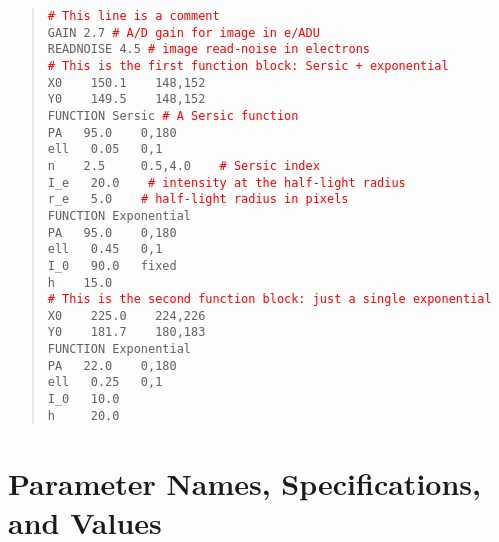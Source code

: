 \documentclass[10pt,a4paper,article]{memoir}
\newcommand{\red}{\textcolor{red}}
\begin{document}
\begin{quote}
  \texttt{\red{\# This line is a comment}}\\
  
  \texttt{GAIN  2.7   \red{\# A/D gain for image in e/ADU}}\\
  \texttt{READNOISE  4.5   \red{\# image read-noise in electrons}}\\
  
  \texttt{\red{\# This is the first function block: Sersic + exponential}}\\
  \texttt{X0 ~~   150.1  ~~ 148,152}\\
  \texttt{Y0 ~~   149.5  ~~ 148,152}\\
  \texttt{FUNCTION   Sersic   \red{\# A Sersic function}}\\
  \texttt{PA  ~  95.0  ~~ 0,180}\\
  \texttt{ell ~   0.05 ~ 0,1}\\
  \texttt{n   ~~   2.5  ~~~ 0.5,4.0 ~~ \red{\# Sersic index}}\\
  \texttt{I\_e ~  20.0 ~~ \red{\# intensity at the half-light radius}}\\
  \texttt{r\_e ~    5.0 ~~ \red{\# half-light radius in pixels}}\\
  \texttt{FUNCTION   Exponential}\\
  \texttt{PA   ~ 95.0  ~~ 0,180}\\
  \texttt{ell  ~  0.45  ~~0,1}\\
  \texttt{I\_0 ~  90.0  ~ fixed}\\
  \texttt{h    ~~ 15.0}\\
  
  \texttt{\red{\# This is the second function block: just a single exponential}}\\
  \texttt{X0 ~~   225.0  ~~ 224,226}\\
  \texttt{Y0 ~~   181.7  ~~ 180,183}\\
  \texttt{FUNCTION   Exponential} \\
  \texttt{PA   ~ 22.0  ~~ 0,180      }\\
  \texttt{ell  ~  0.25 ~ 0,1}\\
  \texttt{I\_0 ~  10.0  }\\
  \texttt{h   ~~~  20.0}\\
\end{quote}


\section{Parameter Names, Specifications, and Values}
\end{document}
